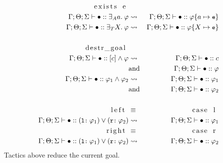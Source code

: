 \documentclass[english, mgr]{iithesis}
\renewcommand{\tt}[1]{\texttt{\small{#1}}}
\begin{document}
\begin{eqnarray*}
  \text{\lstinline[columns=fixed]{exists e} }& & \\
  \jgmnt[\Gamma; \Theta; \Sigma]{\hole\ofkind{\fExistsAtom{\atomv}{\formphi}}} & \leadsto & \jgmnt[\Gamma; \Theta; \Sigma]{\hole\ofkind{\formphi\subst{\atomv}{\tt{e}}}} \\
  \jgmnt[\Gamma; \Theta; \Sigma]{\hole\ofkind{\fExistsTerm{\termv}{\formphi}}} & \leadsto & \jgmnt[\Gamma; \Theta; \Sigma]{\hole\ofkind{\formphi\subst{\termv}{\tt{e}}}} \\
  & & \\
  \text{\lstinline[columns=fixed]{destr_goal} }& & \\
  \jgmnt[\Gamma; \Theta; \Sigma]{\hole\ofkind{\fCAnd{\constr}\formphi}} & \leadsto & \jgmnt[\Gamma; \Theta;\Sigma]{\hole\ofkind{\constr}} \\
  & \text{and} & \jgmnt[\Gamma; \Theta;\Sigma]{\hole\ofkind{\formphi}} \\
  \jgmnt[\Gamma; \Theta; \Sigma]{\hole\ofkind{\formphi_1 \wedge \formphi_2}} & \leadsto & \jgmnt[\Gamma; \Theta;\Sigma]{\hole\ofkind{\formphi_1}} \\
  & \text{and} & \jgmnt[\Gamma; \Theta;\Sigma]{\hole\ofkind{\formphi_2}} \\
  & & \\
  \text{\lstinline[columns=fixed]{left} } & \equiv &  \text{\lstinline[columns=fixed]{case l} } \\
  \jgmnt[\Gamma; \Theta; \Sigma]{\hole\ofkind{(\tt{l:}\:\formphi_1) \vee (\tt{r:}\:\formphi_2)}} & \leadsto & \jgmnt[\Gamma; \Theta;\Sigma]{\hole\ofkind{\formphi_1}} \\
  \text{\lstinline[columns=fixed]{right} } & \equiv &  \text{\lstinline[columns=fixed]{case r} } \\
  \jgmnt[\Gamma; \Theta; \Sigma]{\hole\ofkind{(\tt{l:}\:\formphi_1) \vee (\tt{r:}\:\formphi_2)}} & \leadsto & \jgmnt[\Gamma; \Theta;\Sigma]{\hole\ofkind{\formphi_2}} \\
  \end{eqnarray*}
Tactics above reduce the current goal.
\end{document}
